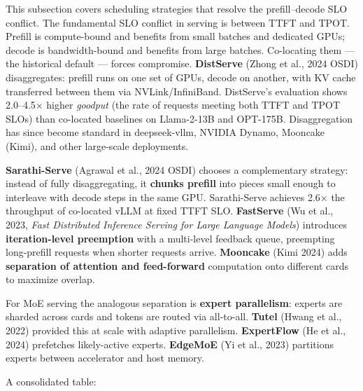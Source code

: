 This subsection covers scheduling strategies that resolve the prefill--decode SLO conflict. The fundamental SLO conflict in serving is between TTFT and TPOT. Prefill is compute-bound and benefits from small batches and dedicated GPUs; decode is bandwidth-bound and benefits from large batches. Co-locating them --- the historical default --- forces compromise. \textbf{DistServe} (Zhong et al., 2024 OSDI) disaggregates: prefill runs on one set of GPUs, decode on another, with KV cache transferred between them via NVLink/InfiniBand. DistServe's evaluation shows 2.0--4.5× higher \emph{goodput} (the rate of requests meeting both TTFT and TPOT SLOs) than co-located baselines on Llama-2-13B and OPT-175B. Disaggregation has since become standard in deepseek-vllm, NVIDIA Dynamo, Mooncake (Kimi), and other large-scale deployments.

\textbf{Sarathi-Serve} (Agrawal et al., 2024 OSDI) chooses a complementary strategy: instead of fully disaggregating, it \textbf{chunks prefill} into pieces small enough to interleave with decode steps in the same GPU. Sarathi-Serve achieves 2.6× the throughput of co-located vLLM at fixed TTFT SLO. \textbf{FastServe} (Wu et al., 2023, \emph{Fast Distributed Inference Serving for Large Language Models}) introduces \textbf{iteration-level preemption} with a multi-level feedback queue, preempting long-prefill requests when shorter requests arrive. \textbf{Mooncake} (Kimi 2024) adds \textbf{separation of attention and feed-forward} computation onto different cards to maximize overlap.

For MoE serving the analogous separation is \textbf{expert parallelism}: experts are sharded across cards and tokens are routed via all-to-all. \textbf{Tutel} (Hwang et al., 2022) provided this at scale with adaptive parallelism. \textbf{ExpertFlow} (He et al., 2024) prefetches likely-active experts. \textbf{EdgeMoE} (Yi et al., 2023) partitions experts between accelerator and host memory.

A consolidated table:

